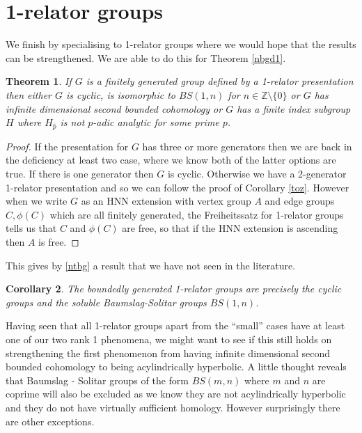 \documentclass[11pt,reqno]{amsart}
\numberwithin{equation}{section}
\newcommand{\Z}{\mathbb{Z}}
\newtheorem{thm}{Theorem}[section]
\newtheorem{cor}[thm]{Corollary}
\theoremstyle{definition}
\theoremstyle{remark}
\begin{document}
  \section{1-relator groups}

  We finish by specialising to 1-relator groups where we would hope that the
  results can be strengthened. We are able to do this for Theorem
  \ref{nbgd1}.

\begin{thm} \label{rel1}
  If $G$ is a finitely generated group defined by a
  1-relator presentation then either
  $G$ is cyclic, is
  isomorphic to $BS(1,n)$ for $n\in\Z\setminus\{0\}$ or
  $G$ has infinite dimensional second bounded cohomology
  or $G$ has a finite index subgroup $H$ where
  $H_{\hat{p}}$ is not $p$-adic analytic for some prime $p$.
\end{thm}
\begin{proof}
  If the presentation for $G$ has three or more generators then we are
  back in the deficiency at least two case, where we know both of
  the latter options are true. If there is one generator then $G$ is
  cyclic. Otherwise we have a 2-generator 1-relator
  presentation and so we can follow the proof of Corollary \ref{toz}.
  However when we write $G$ as an HNN extension with vertex
  group $A$ and edge groups $C,\phi(C)$ which are all finitely generated,
  the Freiheitssatz for 1-relator groups tells us that $C$ and $\phi(C)$
  are free, so that if the HNN extension is ascending then $A$ is free.
\end{proof}

This gives by \ref{ntbg} a result that we have not seen in the literature.
\begin{cor} The boundedly generated 1-relator groups are precisely
  the cyclic groups and the soluble Baumslag-Solitar groups
  $BS(1,n)$.
\end{cor}  

Having seen that all 1-relator groups apart from the ``small'' cases
have at least one of our two rank 1 phenomena, we might want to see
if this still holds on strengthening the first phenomenon from having
infinite dimensional second bounded cohomology to being acylindrically
hyperbolic. A little thought reveals that Baumslag - Solitar groups
of the form $BS(m,n)$ where $m$ and $n$ are coprime will also be
excluded as we know they are not acylindrically hyperbolic and they do
not have virtually sufficient homology. However surprisingly there
are other exceptions.
\end{document}

